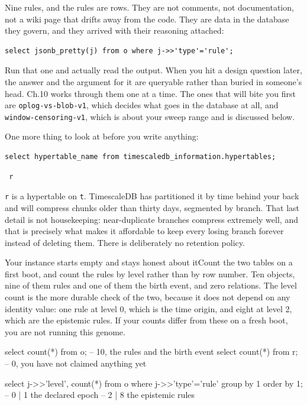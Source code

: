Nine rules, and the rules are rows. They are not comments, not documentation, not a wiki page that drifts away from the code. They are data in the database they govern, and they arrived with their reasoning attached:

\begin{verbatim}
select jsonb_pretty(j) from o where j->>'type'='rule';
\end{verbatim}

Run that one and actually read the output. When you hit a design question later, the answer and the argument for it are queryable rather than buried in someone's head. Ch.10 works through them one at a time. The ones that will bite you first are \verb|oplog-vs-blob-v1|, which decides what goes in the database at all, and \verb|window-censoring-v1|, which is about your sweep range and is discussed below.

One more thing to look at before you write anything:

\begin{verbatim}
select hypertable_name from timescaledb_information.hypertables;
\end{verbatim}

\begin{verbatim}
 r
\end{verbatim}

\verb|r| is a hypertable on \verb|t|. TimescaleDB has partitioned it by time behind your back and will compress chunks older than thirty days, segmented by branch. That last detail is not housekeeping: near-duplicate branches compress extremely well, and that is precisely what makes it affordable to keep every losing branch forever instead of deleting them. There is deliberately no retention policy.

\begin{Correspondence}{Your instance starts empty and stays honest about it}{Count the two tables on a first boot, and count the rules by level rather than by row number.}
Ten objects, nine of them rules and one of them the birth event, and zero relations. The level count is the more durable check of the two, because it does not depend on any identity value: one rule at level 0, which is the time origin, and eight at level 2, which are the epistemic rules. If your counts differ from these on a fresh boot, you are not running this genome.
\begin{Check}
select count(*) from o;              -- 10, the rules and the birth event
select count(*) from r;              -- 0, you have not claimed anything yet

select j->>'level', count(*) from o
 where j->>'type'='rule' group by 1 order by 1;
                                     -- 0 | 1   the declared epoch
                                     -- 2 | 8   the epistemic rules
\end{Check}
\end{Correspondence}

